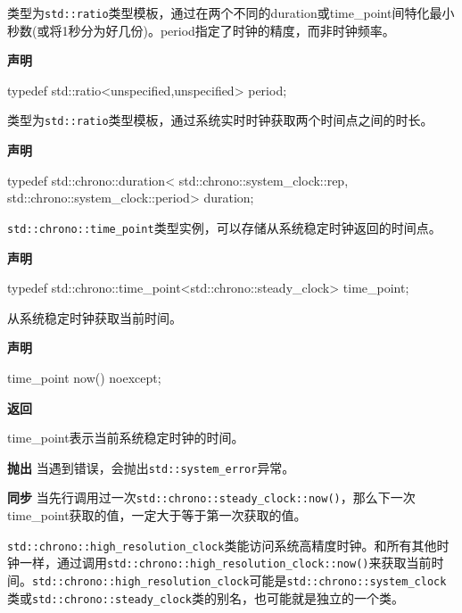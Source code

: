 
类型为\texttt{std::ratio}类型模板，通过在两个不同的duration或time\_point间特化最小秒数(或将1秒分为好几份)。period指定了时钟的精度，而非时钟频率。

\textbf{声明}

\begin{cpp}
typedef std::ratio<unspecified,unspecified> period;
\end{cpp}


类型为\texttt{std::ratio}类型模板，通过系统实时时钟获取两个时间点之间的时长。

\textbf{声明}

\begin{cpp}
typedef std::chrono::duration<
   std::chrono::system_clock::rep,
   std::chrono::system_clock::period> duration;
\end{cpp}


\texttt{std::chrono::time\_point}类型实例，可以存储从系统稳定时钟返回的时间点。

\textbf{声明}

\begin{cpp}
typedef std::chrono::time_point<std::chrono::steady_clock> time_point;
\end{cpp}


从系统稳定时钟获取当前时间。

\textbf{声明}

\begin{cpp}
time_point now() noexcept;
\end{cpp}

\textbf{返回}

time\_point表示当前系统稳定时钟的时间。

\textbf{抛出}
当遇到错误，会抛出\texttt{std::system\_error}异常。

\textbf{同步}
当先行调用过一次\texttt{std::chrono::steady\_clock::now()}，那么下一次time\_point获取的值，一定大于等于第一次获取的值。


\texttt{std::chrono::high\_resolution\_clock}类能访问系统高精度时钟。和所有其他时钟一样，通过调用\texttt{std::chrono::high\_resolution\_clock::now()}来获取当前时间。\texttt{std::chrono::high\_resolution\_clock}可能是\texttt{std::chrono::system\_clock}类或\texttt{std::chrono::steady\_clock}类的别名，也可能就是独立的一个类。

